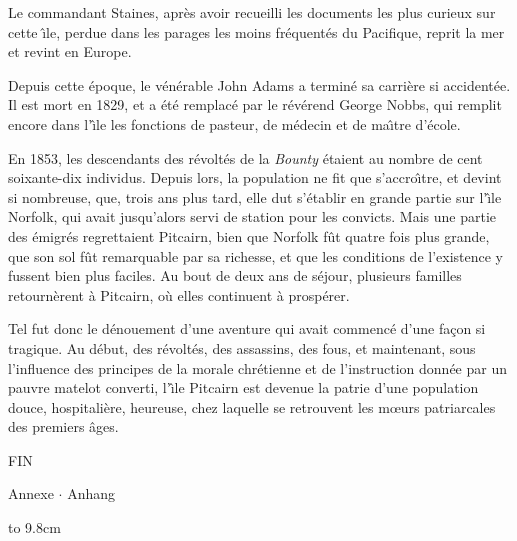 Le commandant Staines, apr\`es avoir recueilli les documents
les plus curieux sur cette {\^\i}le, perdue dans les parages
les moins fr\'equent\'es du Pacifique, reprit la mer
et revint en Europe.

Depuis cette \'epoque, le v\'en\'erable John Adams
a termin\'e sa carri\`ere si accident\'ee.
Il est mort en 1829, et a \'et\'e remplac\'e
par le r\'ev\'erend George Nobbs, qui remplit encore
dans l'{\^\i}le les fonctions de pasteur, de m\'edecin
et de ma{\^\i}tre d'\'ecole.

En 1853, les descendants des r\'evolt\'es de la
{\sl Bounty\/} \'etaient au nombre de cent soixante-dix
individus. Depuis lors, la population ne fit que
s'accro{\^\i}tre, et devint si nombreuse, que, trois ans
plus tard, elle dut s'\'etablir en grande partie
sur l'{\^\i}le Norfolk, qui avait jusqu'alors servi
de station pour les convicts.
Mais une partie des \'emigr\'es regrettaient
Pitcairn, bien que Norfolk f\^ut quatre fois plus grande,
que son sol f\^ut remarquable par sa richesse, et que
les conditions de l'existence y fussent bien plus faciles.
Au bout de deux ans de s\'ejour, plusieurs familles
retourn\`erent \`a Pitcairn, o\`u elles
continuent \`a prosp\'erer.

Tel fut donc le d\'enouement d'une aventure
qui avait commenc\'e d'une fa\c{c}on si
tragique. Au d\'ebut, des r\'evolt\'es,
des assassins, des fous, et maintenant, sous l'influence
des principes de la morale chr\'etienne et de
l'instruction donn\'ee par un pauvre matelot
converti, l'{\^\i}le Pitcairn est devenue la patrie
d'une population douce, hospitali\`ere, heureuse,
chez laquelle se retrouvent les m{\oe}urs patriarcales
des premiers \^ages.

\nobreak\vskip 1pc
\centerline{\sc FIN}
\vfill\eject

\endfrench


\centerline{\sf Annexe $\cdot$ Anhang}
\vfill
\hbox to 9.8cm{\hss
 }
\eject


